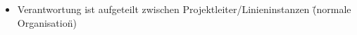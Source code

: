 \begin{multicols}{3}
\begin{itemize}
\begin{itemize}
			\item Verantwortung ist aufgeteilt zwischen Projektleiter/Linieninstanzen {\tiny                                                                                                                                                                                                                                                                                                                                                                                                                                                                                                                                                                                                                                                                                                                                                                                                                                                                                                                                                                                                                                                                                                                                                                                                                                                                                                                                                                                                                                                                                                                                                                                                                                                                                                                                                                                                                                                                                                                                                                                                                                                                                                                                                                                                                                                                                                                                                                                                                                                                                                                                                                                                                                                                                                                                                                                                                                                                                                                                                                                                                                                                                                                                                                                                    {(\"{}normale Organisation\"{})}}

\end{itemize}
\end{itemize}
\end{multicols}
